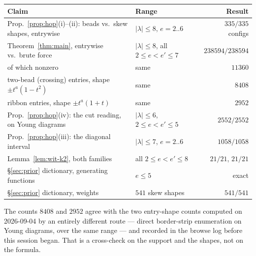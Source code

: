 \documentclass[11pt]{article}
\theoremstyle{definition}
\begin{document}
\begin{center}
\begin{tabular}{llr}
\toprule
Claim & Range & Result\\
\midrule
Prop.~\ref{prop:hop}(i)--(ii): beads vs.\ skew shapes, entrywise
  & $|\lambda|\le8$, $e=2..6$ & $335/335$ configs\\
Theorem~\ref{thm:main}, entrywise vs.\ brute force
  & $|\lambda|\le8$, all $2\le e<e'\le7$ & $238594/238594$\\
\quad of which nonzero & same & $11360$\\
\quad two-bead (crossing) entries, shape $\pm t^a(1-t^2)$ & same & $8408$\\
\quad ribbon entries, shape $\pm t^a(1+t)$ & same & $2952$\\
Prop.~\ref{prop:hop}(iv): the cut reading, on Young diagrams
  & $|\lambda|\le6$, $2\le e<e'\le5$ & $2552/2552$\\
Prop.~\ref{prop:hop}(iii): the diagonal interval
  & $|\lambda|\le7$, $e=2..6$ & $1058/1058$\\
Lemma~\ref{lem:wit-k2}, both families & all $2\le e<e'\le8$ & $21/21$, $21/21$\\
\S\ref{sec:prior} dictionary, generating functions & $e\le5$ & exact\\
\S\ref{sec:prior} dictionary, weights & $541$ skew shapes & $541/541$\\
\bottomrule
\end{tabular}
\end{center}

The counts $8408$ and $2952$ agree with the two entry-shape counts computed on 2026-09-04 by an
entirely different route --- direct border-strip enumeration on Young diagrams, over the same
range --- and recorded in the browse log before this session began. That is a cross-check on the
support and the shapes, not on the formula.
\end{document}
